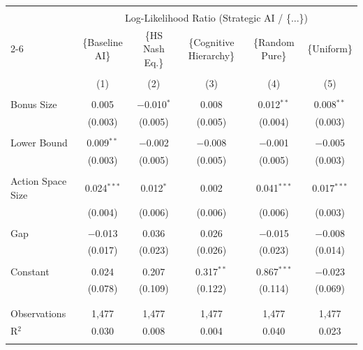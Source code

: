 \begin{tabular}{@{\extracolsep{5pt}}lccccc} 
\\[-1.8ex]\hline 
\hline \\[-1.8ex] 
 & \multicolumn{5}{c}{Log-Likelihood Ratio (Strategic AI / \{...\})} \\ 
\cline{2-6} 
 & \{Baseline AI\} & \{HS Nash Eq.\} & \{Cognitive Hierarchy\} & \{Random Pure\} & \{Uniform\} \\ 
\\[-1.8ex] & (1) & (2) & (3) & (4) & (5)\\ 
\hline \\[-1.8ex] 
 Bonus Size & 0.005 & $-$0.010$^{*}$ & 0.008 & 0.012$^{**}$ & 0.008$^{**}$ \\ 
  & (0.003) & (0.005) & (0.005) & (0.004) & (0.003) \\ 
  & & & & & \\ 
 Lower Bound & 0.009$^{**}$ & $-$0.002 & $-$0.008 & $-$0.001 & $-$0.005 \\ 
  & (0.003) & (0.005) & (0.005) & (0.005) & (0.003) \\ 
  & & & & & \\ 
 Action Space Size & 0.024$^{***}$ & 0.012$^{*}$ & 0.002 & 0.041$^{***}$ & 0.017$^{***}$ \\ 
  & (0.004) & (0.006) & (0.006) & (0.006) & (0.003) \\ 
  & & & & & \\ 
 Gap & $-$0.013 & 0.036 & 0.026 & $-$0.015 & $-$0.008 \\ 
  & (0.017) & (0.023) & (0.026) & (0.023) & (0.014) \\ 
  & & & & & \\ 
 Constant & 0.024 & 0.207 & 0.317$^{**}$ & 0.867$^{***}$ & $-$0.023 \\ 
  & (0.078) & (0.109) & (0.122) & (0.114) & (0.069) \\ 
  & & & & & \\ 
\hline \\[-1.8ex] 
Observations & 1,477 & 1,477 & 1,477 & 1,477 & 1,477 \\ 
R$^{2}$ & 0.030 & 0.008 & 0.004 & 0.040 & 0.023 \\ 
\hline 
\hline \\[-1.8ex] 
\end{tabular}

